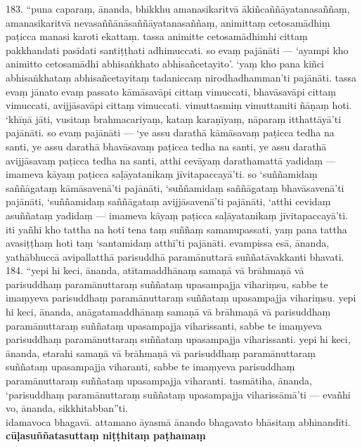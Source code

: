 \documentclass[11pt]{article}
\begin{document}
183. “puna caparaṃ, ānanda, bhikkhu amanasikaritvā ākiñcaññāyatanasaññaṃ, amanasikaritvā nevasaññānāsaññāyatanasaññaṃ, animittaṃ cetosamādhiṃ paṭicca manasi karoti ekattaṃ. tassa animitte cetosamādhimhi cittaṃ pakkhandati pasīdati santiṭṭhati adhimuccati. so evaṃ pajānāti — ‘ayampi kho animitto cetosamādhi abhisaṅkhato abhisañcetayito’. ‘yaṃ kho pana kiñci abhisaṅkhataṃ abhisañcetayitaṃ tadaniccaṃ nirodhadhamman’ti pajānāti. tassa evaṃ jānato evaṃ passato kāmāsavāpi cittaṃ vimuccati, bhavāsavāpi cittaṃ vimuccati, avijjāsavāpi cittaṃ vimuccati. vimuttasmiṃ vimuttamiti ñāṇaṃ hoti. ‘khīṇā jāti, vusitaṃ brahmacariyaṃ, kataṃ karaṇīyaṃ, nāparaṃ itthattāyā’ti pajānāti. so evaṃ pajānāti — ‘ye assu darathā kāmāsavaṃ paṭicca tedha na santi, ye assu darathā bhavāsavaṃ paṭicca tedha na santi, ye assu darathā avijjāsavaṃ paṭicca tedha na santi, atthi cevāyaṃ darathamattā yadidaṃ — imameva kāyaṃ paṭicca saḷāyatanikaṃ jīvitapaccayā’ti. so ‘suññamidaṃ saññāgataṃ kāmāsavenā’ti pajānāti, ‘suññamidaṃ saññāgataṃ bhavāsavenā’ti pajānāti, ‘suññamidaṃ saññāgataṃ avijjāsavenā’ti pajānāti, ‘atthi cevidaṃ asuññataṃ yadidaṃ — imameva kāyaṃ paṭicca saḷāyatanikaṃ jīvitapaccayā’ti. iti yañhi kho tattha na hoti tena taṃ suññaṃ samanupassati, yaṃ pana tattha avasiṭṭhaṃ hoti taṃ ‘santamidaṃ atthī’ti pajānāti. evampissa esā, ānanda, yathābhuccā avipallatthā parisuddhā paramānuttarā suññatāvakkanti bhavati.\\

184. “yepi hi keci, ānanda, atītamaddhānaṃ samaṇā vā brāhmaṇā vā parisuddhaṃ paramānuttaraṃ suññataṃ upasampajja vihariṃsu, sabbe te imaṃyeva parisuddhaṃ paramānuttaraṃ suññataṃ upasampajja vihariṃsu. yepi hi keci, ānanda, anāgatamaddhānaṃ samaṇā vā brāhmaṇā vā parisuddhaṃ paramānuttaraṃ suññataṃ upasampajja viharissanti, sabbe te imaṃyeva parisuddhaṃ paramānuttaraṃ suññataṃ upasampajja viharissanti. yepi hi keci, ānanda, etarahi samaṇā vā brāhmaṇā vā parisuddhaṃ paramānuttaraṃ suññataṃ upasampajja viharanti, sabbe te imaṃyeva parisuddhaṃ paramānuttaraṃ suññataṃ upasampajja viharanti. tasmātiha, ānanda, ‘parisuddhaṃ paramānuttaraṃ suññataṃ upasampajja viharissāmā’ti — evañhi vo, ānanda, sikkhitabban”ti.\\

idamavoca bhagavā. attamano āyasmā ānando bhagavato bhāsitaṃ abhinandīti.\\[.5cm]

\textbf{cūḷasuññatasuttaṃ niṭṭhitaṃ paṭhamaṃ}
\end{document}
